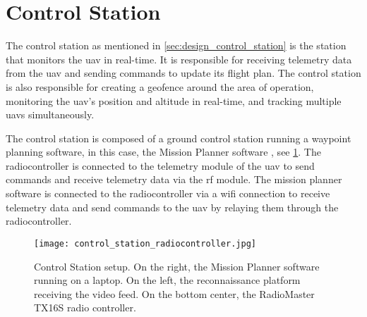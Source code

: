 \section{Control Station}\label{sec:implementation_control_station}

The control station as mentioned in \cref{sec:design_control_station} is the station that monitors the \gls{uav} in real-time. It is responsible for receiving telemetry data from the \gls{uav} and sending commands to update its flight plan. The control station is also responsible for creating a geofence around the area of operation, monitoring the \gls{uav}'s position and altitude in real-time, and tracking multiple \glspl{uav} simultaneously.

The control station is composed of a ground control station running a waypoint planning software, in this case, the Mission Planner software \autocite{ardupilotMissionPlanner}, see \cref{fig:control_station_radiocontroller}. The radiocontroller is connected to the telemetry module of the \gls{uav} to send commands and receive telemetry data via the \gls{rf} module. The mission planner software is connected to the radiocontroller via a \gls{wifi} connection to receive telemetry data and send commands to the \gls{uav} by relaying them through the radiocontroller.

\begin{figure}
  \texttt{[image: control\_station\_radiocontroller.jpg]}
  \caption{Control Station setup. On the right, the Mission Planner software running on a laptop. On the left, the reconnaissance platform receiving the video feed. On the bottom center, the RadioMaster TX16S radio controller.}\label{fig:control_station_radiocontroller}
\end{figure}

